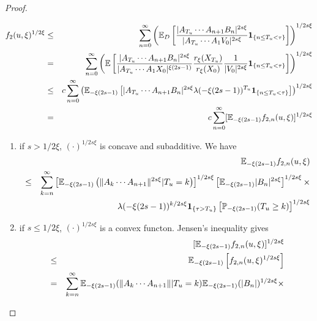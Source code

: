 \documentclass{article}
\begin{document}
\begin{proof}
\begin{enumerate}
\begin{enumerate}
\begin{eqnarray*}
        f_2(u, \xi)^{1/2\xi} &\leq& \sum_{n=0}^\infty \left(\mathbb{E}_D \left[
            \frac{
              |A_{T_u} \cdots A_{n+1} B_n |^{2s\xi}
            }{
              |A_{T_u} \cdots A_1 V_0|^{2s\xi}
            } \mathbf{1}_{\{n \leq T_u < \tau\}}
          \right]\right)^{1/2s\xi} \\
        &=& \sum_{n=0}^\infty \left(\mathbb{E} \left[
            \frac{
              |A_{T_u} \cdots A_{n+1} B_n |^{2s\xi}
            }{
              |A_{T_u} \cdots A_1 X_0|^{\xi(2s - 1)}
            }
            \frac{
              r_{\xi}(X_{T_u})
            }{
              r_{\xi}(X_{0})
            }
            {1 \over |V_0|^{2s\xi}}\mathbf{1}_{\{n \leq T_u < \tau\}}
          \right]\right)^{1/2s\xi} \\
        &\leq& c \sum_{n=0}^\infty
        \left(\mathbb{E}_{-\xi(2s - 1)} \left[
            |A_{T_u} \cdots A_{n+1} B_n |^{2s\xi}
            \lambda(-\xi(2s - 1))^{T_u}
            \mathbf{1}_{\{n \leq T_u < \tau\}}
          \right]\right)^{1/2s\xi} \\
        &=& c \sum_{n=0}^\infty [\mathbb{E}_{-\xi(2s - 1)}
        f_{2,n}(u,\xi)]^{1/2s\xi}
      \end{eqnarray*}
      \begin{enumerate}
      \item if $s > 1/2\xi$, $(\cdot)^{1/2s\xi}$ is concave and
        subadditive. We have
        \begin{eqnarray*}
          && \mathbb{E}_{-\xi(2s - 1)} f_{2,n}(u,\xi) \\
          &\leq& \sum_{k=n}^\infty
          \left[\mathbb{E}_{-\xi(2s - 1)}\left(
            \|A_k \cdots A_{n+1}\|^{2s\xi}|T_u = k
          \right)\right]^{1/2s\xi}
          \left[\mathbb{E}_{-\xi(2s - 1)} |B_n|^{2s\xi}\right]^{1/2s\xi} \times \\
          && \lambda(-\xi(2s - 1))^{k/2s\xi} \mathbf{1}_{\{\tau > T_u\}}
          \left[ \mathbb{P}_{-\xi(2s - 1)}(T_u \geq k) \right]^{1/2s\xi}
        \end{eqnarray*}
      \item if $s \leq 1/2\xi$, $(\cdot)^{1/2s\xi}$ is a convex
        functon. Jensen's inequality gives
        \begin{eqnarray*}
          && [\E_{-\xi(2s - 1)} f_{2,n}(u,\xi)]^{1/2s\xi} \\
          &\leq& \E_{-\xi(2s - 1)} \left[ f_{2,n}(u,\xi)^{1/2s\xi} \right]\\
          &=& \sum_{k=n}^\infty
          \E_{-\xi(2s - 1)}(\|A_k \cdots A_{n+1}\| | T_u = k)
          \E_{-\xi(2s - 1)}(|B_n|)^{1/2s\xi} \times \\

\end{eqnarray*}
\end{enumerate}
\end{enumerate}
\end{enumerate}
\end{proof}
\end{document}
